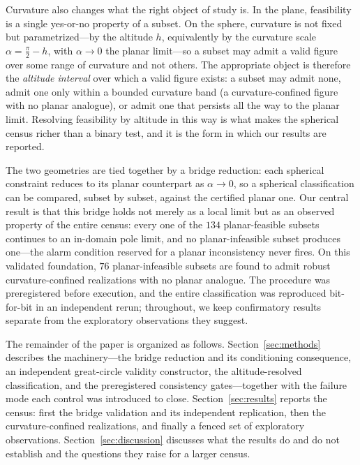 \documentclass[11pt]{article}
\begin{document}
Curvature also changes what the right object of study is. In the plane,
feasibility is a single yes-or-no property of a subset. On the sphere, curvature is not fixed but parametrized---by the altitude $h$, equivalently by the curvature scale $\alpha=\tfrac{\pi}{2}-h$, with $\alpha\to 0$ the planar limit---so a subset may admit a valid figure over some range of curvature and not others. The appropriate object is therefore the \emph{altitude interval} over which a valid figure exists: a subset may admit none, admit one only within a bounded curvature band (a curvature-confined figure with no planar analogue), or admit one that persists all the way to the planar limit. Resolving feasibility by altitude in this way is what makes the spherical census richer than a binary test, and it is the form in which our results are reported.

The two geometries are tied together by a bridge reduction: each spherical
constraint reduces to its planar counterpart as $\alpha\to 0$, so a spherical
classification can be compared, subset by subset, against the certified planar one. Our central result is that this bridge holds not merely as a local limit but as an observed property of the entire census: every one of the $134$ planar-feasible subsets continues to an in-domain pole limit, and no planar-infeasible subset produces one---the alarm condition reserved for a planar inconsistency never fires. On this validated foundation, $76$ planar-infeasible subsets are found to admit robust curvature-confined realizations with no planar analogue. The procedure was preregistered before execution, and the entire classification was reproduced bit-for-bit in an independent rerun; throughout, we keep confirmatory results separate from the exploratory observations they suggest.

The remainder of the paper is organized as follows. Section~\ref{sec:methods}
describes the machinery---the bridge reduction and its conditioning consequence, an independent great-circle validity constructor, the altitude-resolved classification, and the preregistered consistency gates---together with the failure mode each control was introduced to close. Section~\ref{sec:results} reports the census: first the bridge validation and its independent replication, then the curvature-confined realizations, and finally a fenced set of exploratory observations. Section~\ref{sec:discussion} discusses what the results do and do not establish and the questions they raise for a larger census.
\end{document}
